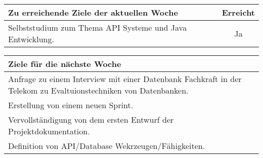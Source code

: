 \begin{tabularx}{\textwidth}{Xc}
    \arrayrulecolor{OliveGreen}
    \toprule
    {\bfseries Zu erreichende Ziele der aktuellen Woche} & {\bfseries Erreicht} \\
    \midrule[2pt]
    Selbststudium zum Thema API Systeme und Java Entwicklung.                   &Ja                    \\
    \bottomrule[2pt]
\end{tabularx}
%
\vspace{1cm}
%
\begin{tabularx}{\textwidth}{Xc}
    \arrayrulecolor{OliveGreen}
    \toprule
    {\bfseries Ziele für die nächste Woche}              &                      \\
    \midrule[2pt]
    Anfrage zu einem Interview mit einer Datenbank Fachkraft in der
    Telekom zu Evaltuionstechniken von Datenbanken.  &  \\
    \rowcolor{OliveGreen!15}
    Erstellung von einem neuen Sprint.  &  \\
    \rowcolor{White}
    Vervollständigung von dem ersten Entwurf der
    Projektdokumentation.  &  \\
    \rowcolor{OliveGreen!15}
    Definition von API/Database Wekrzeugen/Fähigkeiten.  &  \\
\end{tabularx}
